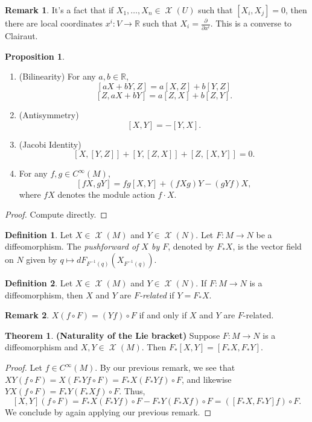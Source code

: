 \documentclass[10pt,letterpaper,cm]{nupset}
\theoremstyle{definition}
\newtheorem*{definition}{Definition}
\newtheorem{remark}{Remark}
\newtheorem{theorem}{Theorem}
\newtheorem{prop}{Proposition}
\newcommand{\R}{\mathbb R}
\newcommand{\1}{\mathbf{1}}
\newcommand{\0}{\vec 0}
\DeclareMathOperator{\vf}{\mathscr{X}}
\begin{document}
\begin{remark}
It's a fact that if $X_1, \ldots, X_n \in \vf(U)$ such that $[X_i, X_j]= 0$, then there are local coordinates $x^i : V \to \R$ such that $X_i  =\frac{\partial}{\partial{x^i}}$. This is a converse to Clairaut.
\end{remark}

\begin{prop} $ $
\begin{enumerate}
\item (Bilinearity) For any $a,b \in \R$, $$[aX + bY, Z] = a[X, Z] + b[Y, Z]$$ $$[Z, aX + bY] = a[Z, X] + b[Z, Y]. $$ 
\item (Antisymmetry) $$[X, Y] = -[Y,X].$$
\item (Jacobi Identity) $$[X, [Y, Z]]+ [Y, [Z, X]] + [Z, [X, Y]] =0  . $$
\item For any $f, g \in C^{\infty}(M)$, $$[fX, gY] = fg[X, Y] + (fXg)Y - (gYf)X, $$ where $fX$ denotes the module action $f \cdot X$.
\end{enumerate}
\end{prop}
\begin{proof} Compute directly. \end{proof}

\begin{definition}
Let $X \in \vf(M)$ and $Y \in \vf(N)$. Let $F: M \to N$ be a diffeomorphism. The \textit{pushforward of $X$ by $F$}, denoted by $F_{\ast}X$, is the vector field on $N$ given by $q \mapsto dF_{F^{-1}(q)}(X_{F^{-1}(q)})$.
\end{definition}

\begin{definition}
Let $X \in \vf(M)$ and $Y \in \vf(N)$. If $F: M \to N$ is a diffeomorphism, then $X$ and $Y$ are \textit{$F$-related} if $Y = F_{\ast}X$.
\end{definition}

\begin{remark}
$X(f \circ F) = (Yf) \circ F$ if and only if $X$ and $Y$ are $F$-related.
\end{remark}

\begin{theorem}{\textbf{(Naturality of the Lie bracket)}}
Suppose $F: M \to N$ is a diffeomorphism and $X, Y \in \vf(M)$. Then $F_{\ast}[X, Y] = [F_{\ast}X, F_{\ast}Y]$.
\end{theorem}
\begin{proof}
Let $ f\in C^{\infty}(M)$. By our previous remark, we see that $XY(f \circ F) = X(F_{\ast}Yf \circ F) = F_{\ast}X(F_{\ast}Yf) \circ F$, and likewise $YX(f \circ F) = F_{\ast}Y(F_{\ast}X f) \circ F$. Thus, $$[X, Y](f \circ F) = F_{\ast}X(F_{\ast}Yf) \circ F - F_{\ast}Y(F_{\ast}X f) \circ F = ([F_{\ast}X, F_{\ast}Y] f) \circ F.$$ We conclude by again applying our previous remark.
\end{proof}
\end{document}
